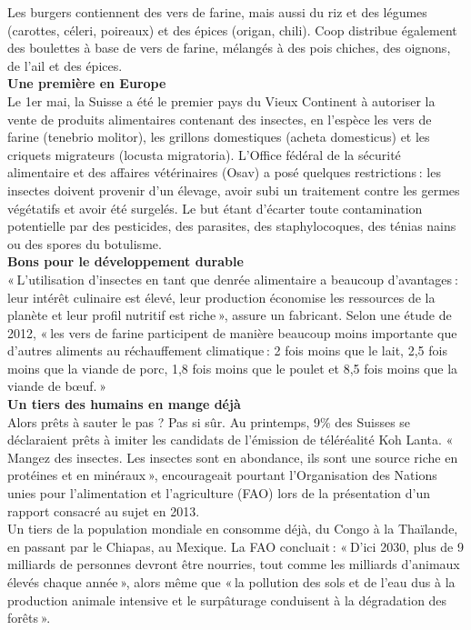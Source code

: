 \documentclass[8pt]{article}
\begin{document}
Les burgers contiennent des vers de farine, mais aussi du riz et des légumes (carottes, céleri, poireaux) et des épices (origan, chili). Coop distribue également des boulettes à base de vers de farine, mélangés à des pois chiches, des oignons, de l’ail et des épices.\\

\textbf{Une première en Europe}\\

Le 1er mai, la Suisse a été le premier pays du Vieux Continent à autoriser la vente de produits alimentaires contenant des insectes, en l’espèce les vers de farine (tenebrio molitor), les grillons domestiques (acheta domesticus) et les criquets migrateurs (locusta migratoria). L’Office fédéral de la sécurité alimentaire et des affaires vétérinaires (Osav) a posé quelques restrictions : les insectes doivent provenir d’un élevage, avoir subi un traitement contre les germes végétatifs et avoir été surgelés. Le but étant d’écarter toute contamination potentielle par des pesticides, des parasites, des staphylocoques, des ténias nains ou des spores du botulisme.\\

\textbf{Bons pour le développement durable}\\

« L’utilisation d’insectes en tant que denrée alimentaire a beaucoup d’avantages : leur intérêt culinaire est élevé, leur production économise les ressources de la planète et leur profil nutritif est riche », assure un fabricant. Selon une étude de 2012, « les vers de farine participent de manière beaucoup moins importante que d’autres aliments au réchauffement climatique : 2 fois moins que le lait, 2,5 fois moins que la viande de porc, 1,8 fois moins que le poulet et 8,5 fois moins que la viande de bœuf. »\\


\textbf{Un tiers des humains en mange déjà}\\

Alors prêts à sauter le pas ? Pas si sûr. Au printemps, 9\% des Suisses se déclaraient prêts à imiter les candidats de l’émission de téléréalité Koh Lanta. « Mangez des insectes. Les insectes sont en abondance, ils sont une source riche en protéines et en minéraux », encourageait pourtant l’Organisation des Nations unies pour l’alimentation et l’agriculture (FAO) lors de la présentation d’un rapport consacré au sujet en 2013.
\\

Un tiers de la population mondiale en consomme déjà, du Congo à la Thaïlande, en passant par le Chiapas, au Mexique. La FAO concluait : « D’ici 2030, plus de 9 milliards de personnes devront être nourries, tout comme les milliards d’animaux élevés chaque année », alors même que « la pollution des sols et de l’eau dus à la production animale intensive et le surpâturage conduisent à la dégradation des forêts ».\\
\end{document}
